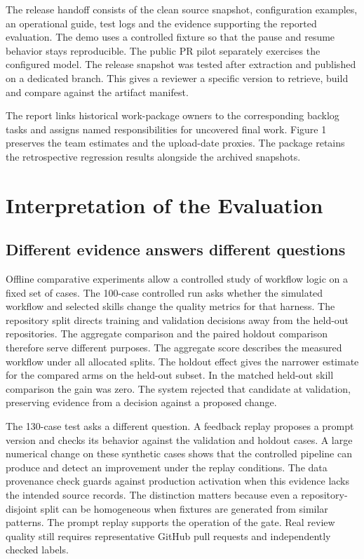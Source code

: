 \documentclass[journal,compsoc]{IEEEtran}
\begin{document}
The release handoff consists of the clean source snapshot, configuration examples, an operational guide, test logs and the evidence supporting the reported evaluation. The demo uses a controlled fixture so that the pause and resume behavior stays reproducible. The public PR pilot separately exercises the configured model. The release snapshot was tested after extraction and published on a dedicated branch. This gives a reviewer a specific version to retrieve, build and compare against the artifact manifest.

The report links historical work-package owners to the corresponding backlog tasks and assigns named responsibilities for uncovered final work. Figure 1 preserves the team estimates and the upload-date proxies. The package retains the retrospective regression results alongside the archived snapshots.

\section{Interpretation of the Evaluation}
\subsection{Different evidence answers different questions}
Offline comparative experiments allow a controlled study of workflow logic on a fixed set of cases. The 100-case controlled run asks whether the simulated workflow and selected skills change the quality metrics for that harness. The repository split directs training and validation decisions away from the held-out repositories. The aggregate comparison and the paired holdout comparison therefore serve different purposes. The aggregate score describes the measured workflow under all allocated splits. The holdout effect gives the narrower estimate for the compared arms on the held-out subset. In the matched held-out skill comparison the gain was zero. The system rejected that candidate at validation, preserving evidence from a decision against a proposed change.

The 130-case test asks a different question. A feedback replay proposes a prompt version and checks its behavior against the validation and holdout cases. A large numerical change on these synthetic cases shows that the controlled pipeline can produce and detect an improvement under the replay conditions. The data provenance check guards against production activation when this evidence lacks the intended source records. The distinction matters because even a repository-disjoint split can be homogeneous when fixtures are generated from similar patterns. The prompt replay supports the operation of the gate. Real review quality still requires representative GitHub pull requests and independently checked labels.
\end{document}

